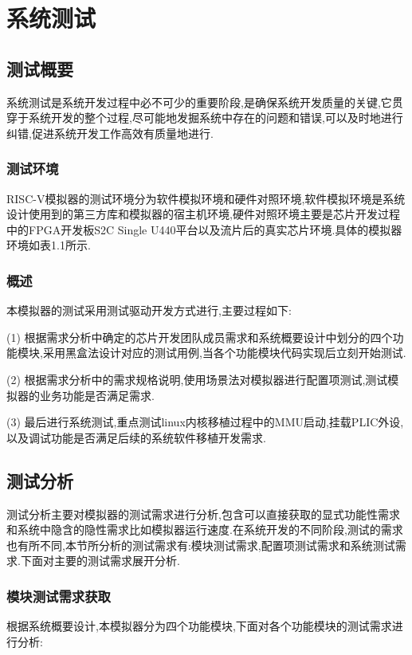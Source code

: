 
\chapter{系统测试}

\section{测试概要}
系统测试是系统开发过程中必不可少的重要阶段,是确保系统开发质量的关键,它贯穿于系统开发的整个过程,尽可能地发掘系统中存在的问题和错误,可以及时地进行纠错,促进系统开发工作高效有质量地进行.

\subsection{测试环境}
RISC-V模拟器的测试环境分为软件模拟环境和硬件对照环境,软件模拟环境是系统设计使用到的第三方库和模拟器的宿主机环境,硬件对照环境主要是芯片开发过程中的FPGA开发板S2C Single U440平台以及流片后的真实芯片环境.具体的模拟器环境如表1.1所示.


\subsection{概述}
本模拟器的测试采用测试驱动开发方式进行,主要过程如下:


(1) 根据需求分析中确定的芯片开发团队成员需求和系统概要设计中划分的四个功能模块,采用黑盒法设计对应的测试用例,当各个功能模块代码实现后立刻开始测试.


(2) 根据需求分析中的需求规格说明,使用场景法对模拟器进行配置项测试,测试模拟器的业务功能是否满足需求.


(3) 最后进行系统测试,重点测试linux内核移植过程中的MMU启动,挂载PLIC外设,以及调试功能是否满足后续的系统软件移植开发需求.


\section{测试分析}
测试分析主要对模拟器的测试需求进行分析,包含可以直接获取的显式功能性需求和系统中隐含的隐性需求比如模拟器运行速度.在系统开发的不同阶段,测试的需求也有所不同,本节所分析的测试需求有:模块测试需求,配置项测试需求和系统测试需求.下面对主要的测试需求展开分析.

\subsection{模块测试需求获取}
根据系统概要设计,本模拟器分为四个功能模块,下面对各个功能模块的测试需求进行分析:


